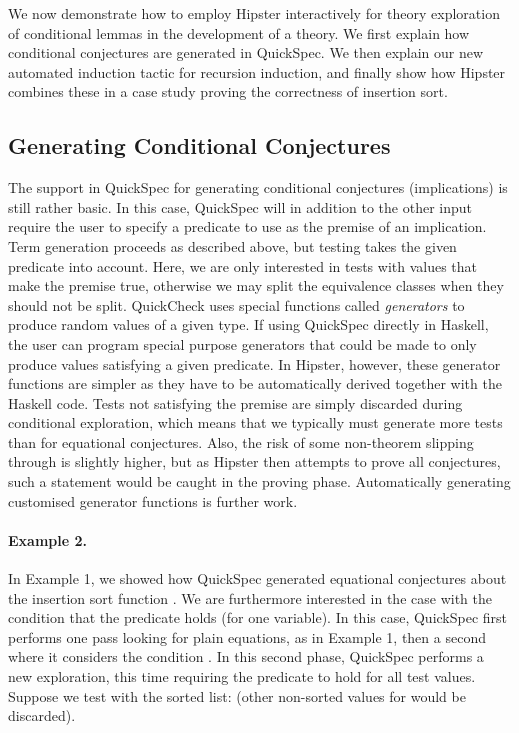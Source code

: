 \label{sec:conditionals}

We now demonstrate how to employ Hipster interactively for theory exploration of conditional lemmas in the development of a theory.%
%
We first explain how conditional conjectures are generated in QuickSpec.
%
We then explain our new automated induction tactic for recursion induction, and finally show how Hipster combines these in a case study proving the correctness of insertion sort.  

\subsection{Generating Conditional Conjectures}
\label{sub:gencond}

The support in QuickSpec for generating conditional conjectures (implications) is still rather basic.
%
In this case, QuickSpec will in addition to the other input require the user to specify a predicate to use as the premise of an implication.
%
Term generation proceeds as described above, but testing takes the given predicate into account.
%
Here, we are only interested in tests with values that make the premise true, otherwise we may split the equivalence classes when they should not be split.
QuickCheck uses special functions called \emph{generators} to produce random values of a given type.
%
If using QuickSpec directly in Haskell, the user can program special purpose generators that could be made to only produce values satisfying a given predicate.
%
In Hipster, however, these generator functions are simpler as they have to be automatically derived together with the Haskell code.
%
Tests not satisfying the premise are simply discarded during conditional exploration, which means that we typically must generate more tests than for equational conjectures.
%
Also, the risk of some non-theorem slipping through is slightly higher, but as Hipster then attempts to prove all conjectures, such a statement would be caught in the proving phase.
%
Automatically generating customised generator functions is further work. 

\paragraph*{Example 2.}
\label{example2}
In Example 1, we showed how QuickSpec generated equational conjectures about the insertion sort function .
%
We are furthermore interested in the case with the condition that the predicate  holds (for one variable).
%
In this case, QuickSpec first performs one pass looking for plain equations, as in Example 1, then a second where it considers the condition .
%
In this second phase, QuickSpec performs a new exploration, this time requiring the predicate  to hold for all test values.
%
Suppose we test with the sorted list:  (other non-sorted values for  would be discarded).       


